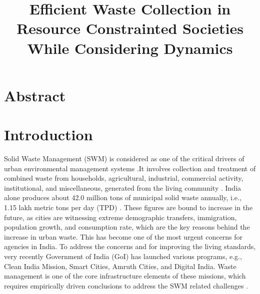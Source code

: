 \documentclass[12pt]{article}
\begin{document}
\title{Efficient Waste Collection in Resource Constrainted Societies While Considering Dynamics}
\date{}
\maketitle
\section{Abstract}
\pagebreak
\section{Introduction}

Solid Waste Management (SWM) is considered as one of the critical drivers of urban environmental management systems \parencite{hoornweg2012waste}.It involves collection and treatment of combined waste from households, agricultural, industrial, commercial activity, institutional, and miscellaneous, generated from the living community \parencite{GUPTA2015206}. India alone produces about 42.0 million tons of municipal solid waste annually, i.e., 1.15 lakh metric tons per day (TPD) \parencite{SHARMA2021293,GUPTA2015206}. These figures are bound to increase in the future, as cities are witnessing extreme demographic transfers, immigration, population growth, and consumption rate, which are the key reasons behind the increase in urban waste. This has become one of the most urgent concerns for agencies in India. To address the concerns and for improving the living standards, very recently Government of India (GoI) has launched various programs, e.g., Clean India Mission, Smart Cities, Amruth Cities, and Digital India. Waste management is one of the core infrastructure elements of these missions, which requires empirically driven conclusions to address the SWM related challenges \parencite{CHEELA2021419}. 
\end{document}
